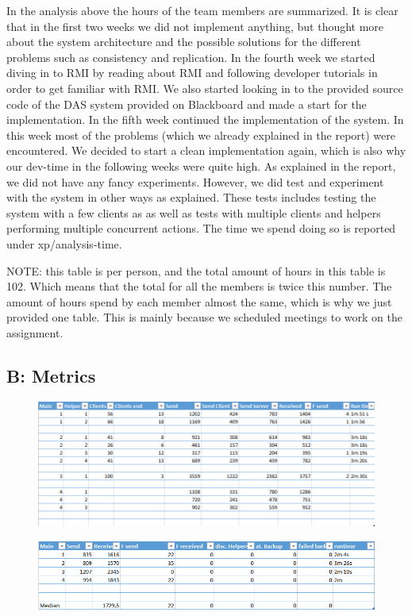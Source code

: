 In the analysis above the hours of the team members are summarized. 
It is clear that in the first two weeks we did not implement anything, but thought more about the system architecture and the possible solutions for the different problems such as consistency and replication.
In the fourth week we started diving in to RMI by reading about RMI and following developer tutorials in order to get familiar with  RMI.
We also started looking in to the provided source code of the DAS system provided on Blackboard and made a start for the implementation.
In the fifth week continued the implementation of the system.
In this week most of the problems (which we already explained in the report) were encountered. 
We decided to start a clean implementation again, which is also why our dev-time in the following weeks were quite high.
As explained in the report, we did not have any fancy experiments. 
However, we did test and experiment with the system in other ways as explained.
These tests includes testing the system with a few clients as as well as tests with multiple clients and helpers performing multiple concurrent actions.
The time we spend doing so is reported under xp/analysis-time.

NOTE: this table is per person, and the total amount of hours in this table is 102.
Which means that the total for all the members is twice this number.
The amount of hours spend by each member almost the same, which is why we just provided one table.
This is mainly because we scheduled meetings to work on the assignment.

\subsection{B: Metrics}
\begin{figure}[ht]
\includegraphics[scale=0.5]{M1.png}
\end{figure}

\begin{figure}[ht]
\includegraphics[scale=0.5]{M2.png}
\end{figure}


